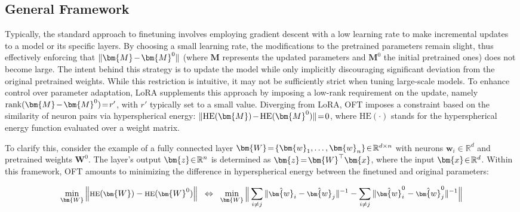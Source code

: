 \subsection{General Framework}

Typically, the standard approach to finetuning involves employing gradient descent with a low learning rate to make incremental updates to a model or its specific layers. By choosing a small learning rate, the modifications to the pretrained parameters remain slight, thus effectively enforcing that $\thickmuskip=2mu \medmuskip=2mu \|\bm{M} - \bm{M}^0\|$ (where $\bm{M}$ represents the updated parameters and $\bm{M}^0$ the initial pretrained ones) does not become large. The intent behind this strategy is to update the model while only implicitly discouraging significant deviation from the original pretrained weights. While this restriction is intuitive, it may not be sufficiently strict when tuning large-scale models. To enhance control over parameter adaptation, LoRA supplements this approach by imposing a low-rank requirement on the update, namely $\thickmuskip=2mu \medmuskip=2mu \text{rank}(\bm{M} - \bm{M}^0) = r'$, with $r'$ typically set to a small value. Diverging from LoRA, OFT imposes a constraint based on the similarity of neuron pairs via hyperspherical energy: $\thickmuskip=2mu \medmuskip=2mu \| \text{HE}(\bm{M}) - \text{HE}(\bm{M}^0) \| = 0$, where $\text{HE}(\cdot)$ stands for the hyperspherical energy function evaluated over a weight matrix. 

To clarify this, consider the example of a fully connected layer $\thickmuskip=2mu \medmuskip=2mu \bm{W} = \{\bm{w}_1, \ldots, \bm{w}_n\} \in \mathbb{R}^{d \times n}$ with neurons $\bm{w}_i \in \mathbb{R}^d$ and pretrained weights $\bm{W}^0$. The layer's output $\thickmuskip=2mu \medmuskip=2mu \bm{z}\in\mathbb{R}^n$ is determined as $\thickmuskip=2mu \medmuskip=2mu \bm{z} = \bm{W}^\top \bm{x}$, where the input $\thickmuskip=2mu \medmuskip=2mu \bm{x} \in \mathbb{R}^d$. Within this framework, OFT amounts to minimizing the difference in hyperspherical energy between the finetuned and original parameters:

\begin{equation}\label{eq:oft_principle}
\footnotesize
\min_{\bm{W}} \left\| \text{HE}(\bm{W})-\text{HE}(\bm{W}^0)\right\|~~\Leftrightarrow~~\min_{\bm{W}} \bigg{\|} \sum_{i\neq j} \|\hat{\bm{w}}_i-\hat{\bm{w}}_j\|^{-1}-\sum_{i\neq j} \|\hat{\bm{w}}^0_i-\hat{\bm{w}}^0_j\|^{-1}\bigg{\|}
\end{equation}

